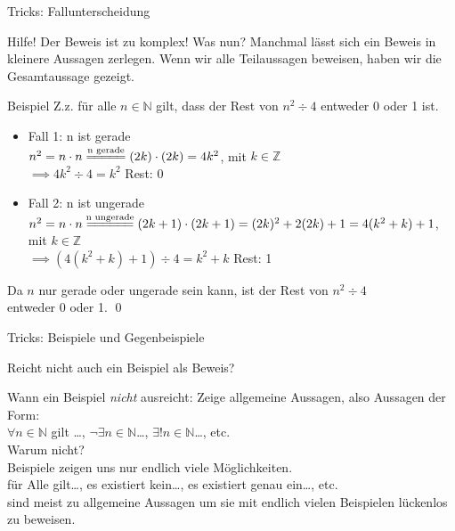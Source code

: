 \begin{frame}[fragile]{Tricks: Fallunterscheidung}
    \begin{alertblock}{Hilfe! Der Beweis ist zu komplex! Was nun?}
        Manchmal lässt sich ein Beweis in kleinere Aussagen zerlegen. Wenn wir alle Teilaussagen beweisen, haben wir die Gesamtaussage gezeigt.
    \end{alertblock}
    \small\begin{exampleblock}{Beispiel}
        Z.z. für alle $n\in\mathbb{N}$ gilt, dass der Rest von $n^2 \div 4$ entweder 0 oder 1 ist.
        \footnotesize\begin{itemize}
            \item 
                \alert{Fall 1:} n ist gerade\\
                $n^2=n\cdot n\overset{\text{n gerade}}{=\joinrel=\joinrel=\joinrel=\joinrel=}(2k)\cdot(2k) = 4k^2$,  mit $k\in\mathbb{Z}$\\
                $\implies 4k^2 \div 4 = k^2$ Rest: 0
            \item \alert{Fall 2:} n ist ungerade\\
                $n^2=n\cdot n\overset{\text{n ungerade}}{=\joinrel=\joinrel=\joinrel=\joinrel=\joinrel=}(2k+1)\cdot(2k+1)=(2k)^2+2(2k)+1=4(k^2+k)+1$, \\mit $k\in\mathbb{Z}$\\
                $\implies (4(k^2+k)+1) \div 4= k^2+k$ Rest: 1
        \end{itemize}
        Da $n$ nur gerade oder ungerade sein kann, ist der Rest von $n^2\div4$ \\entweder 0 oder 1. \qed\;
    \end{exampleblock}
\end{frame}

\begin{frame}[fragile]{Tricks: Beispiele und Gegenbeispiele}
    \begin{alertblock}{Reicht nicht auch ein Beispiel als Beweis?}
    \end{alertblock}
    \begin{block}{Wann ein Beispiel \emph{nicht} ausreicht:}
        Zeige allgemeine Aussagen, also Aussagen der Form:\\$\forall n\in\mathbb{N}$ gilt \dots, $\neg\exists n\in\mathbb{N}$\dots, $\exists!n\in\mathbb{N}$\dots, etc.\\
        \alert{Warum nicht?}\\
        Beispiele zeigen uns nur endlich viele Möglichkeiten.\\
        \glqq für Alle gilt\dots\grqq, \glqq es existiert kein\dots\grqq, \glqq es existiert genau ein\dots\grqq, etc. \\sind meist zu allgemeine Aussagen um sie mit endlich vielen Beispielen lückenlos zu beweisen.
    \end{block}
\end{frame}

